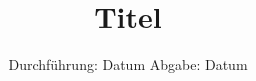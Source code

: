 

\subject{Vxyz}
\title{Titel}
\date{
  Durchführung: Datum
  \hspace{3em}
  Abgabe: Datum
}



\maketitle
\newpage





%



\printbibliography


